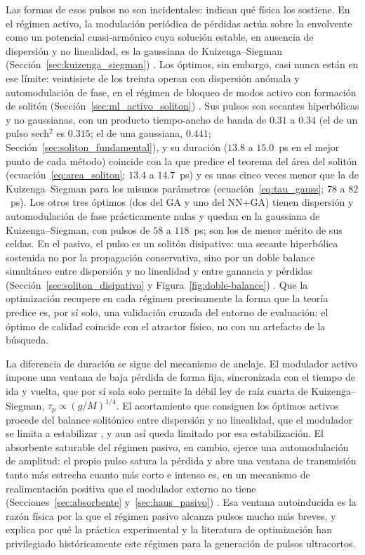 Las formas de esos pulsos no son incidentales: indican qué física los sostiene. En el
régimen activo, la modulación periódica de pérdidas actúa sobre la envolvente como un
potencial cuasi-armónico cuya solución estable, en ausencia de dispersión y no
linealidad, es la gaussiana de Kuizenga--Siegman (Sección~\ref{sec:kuizenga_siegman}) \cite{KuizengaSiegman1970,Keller2022}.
Los óptimos, sin embargo, casi nunca están en ese límite: veintisiete de los treinta
operan con dispersión anómala y automodulación de fase, en el régimen de bloqueo de modos
activo con formación de solitón (Sección~\ref{sec:ml_activo_soliton}) \cite{Kaertner2020}. Sus pulsos son secantes hiperbólicas
y no gaussianas, con un producto tiempo-ancho de banda de $0.31$ a $0.34$ (el de un pulso sech$^2$ es $0.315$; el de una gaussiana, $0.441$; Sección~\ref{sec:soliton_fundamental}), y su duración
($13.8$ a $15.0$~ps en el mejor punto de cada método) coincide con la que predice el
teorema del área del solitón (ecuación~\eqref{eq:area_soliton}; $13.4$ a $14.7$~ps) y es unas cinco veces menor que la de
Kuizenga--Siegman para los mismos parámetros (ecuación~\eqref{eq:tau_gauss}; $78$ a $82$~ps). Los otros tres óptimos
(dos del GA y uno del NN+GA) tienen dispersión y automodulación de fase prácticamente
nulas y quedan en la gaussiana de Kuizenga--Siegman, con pulsos de $58$ a $118$~ps; son
los de menor mérito de sus celdas.
En el pasivo, el pulso es un solitón disipativo: una secante hiperbólica sostenida no por
la propagación conservativa, sino por un doble balance simultáneo entre dispersión y no
linealidad y entre ganancia y pérdidas (Sección~\ref{sec:soliton_disipativo} y
Figura~\ref{fig:doble-balance}) \cite{GreluAkhmediev2012,Keller2022}. Que la
optimización recupere en cada régimen precisamente la forma que la teoría predice es, por
sí solo, una validación cruzada del entorno de evaluación: el óptimo de calidad coincide
con el atractor físico, no con un artefacto de la búsqueda.

La diferencia de duración se sigue del mecanismo de anclaje. El modulador activo impone
una ventana de baja pérdida de forma fija, sincronizada con el tiempo de ida y vuelta,
que por sí sola solo permite la débil ley de raíz cuarta de Kuizenga--Siegman,
$\tau_p\propto(g/M)^{1/4}$. El acortamiento que consiguen los óptimos activos procede del
balance solitónico entre dispersión y no linealidad, que el modulador se limita a
estabilizar \cite{Kaertner2020}, y aun así queda limitado por esa estabilización. El absorbente saturable del
régimen pasivo, en cambio, ejerce una automodulación de amplitud: el propio pulso satura
la pérdida y abre una ventana de transmisión tanto más estrecha cuanto más corto e intenso
es, en un mecanismo de realimentación positiva que el modulador externo no tiene
(Secciones~\ref{sec:absorbente} y~\ref{sec:haus_pasivo}) \cite{Keller2022}. Esa ventana autoinducida es la razón física por la que el régimen
pasivo alcanza pulsos mucho más breves, y explica por qué la práctica experimental y la
literatura de optimización han privilegiado históricamente este régimen para la generación
de pulsos ultracortos.

